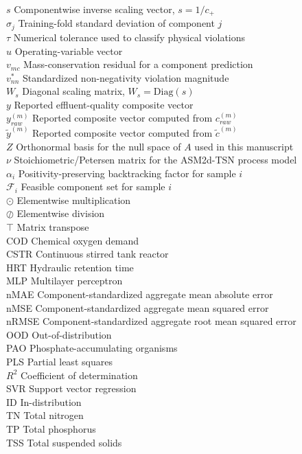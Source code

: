 \documentclass[a4paper,fleqn]{cas-sc}
\begin{document}
\begin{tabbing}
$s$ \> Componentwise inverse scaling vector, $s=1/c_+$ \\
$\sigma_j$ \> Training-fold standard deviation of component $j$ \\
$\tau$ \> Numerical tolerance used to classify physical violations \\
$u$ \> Operating-variable vector \\
$v_{mc}$ \> Mass-conservation residual for a component prediction \\
$v_{nn}^{*}$ \> Standardized non-negativity violation magnitude \\
$W_s$ \> Diagonal scaling matrix, $W_s=\mathrm{Diag}(s)$ \\
$y$ \> Reported effluent-quality composite vector \\
$y_{raw}^{(m)}$ \> Reported composite vector computed from $c_{raw}^{(m)}$ \\
$\tilde{y}^{(m)}$ \> Reported composite vector computed from $\tilde{c}^{(m)}$ \\
$Z$ \> Orthonormal basis for the null space of $A$ used in this manuscript \\
$\nu$ \> Stoichiometric/Petersen matrix for the ASM2d-TSN process model \\
$\alpha_i$ \> Positivity-preserving backtracking factor for sample $i$ \\
$\mathcal{F}_i$ \> Feasible component set for sample $i$ \\
$\odot$ \> Elementwise multiplication \\
$\oslash$ \> Elementwise division \\
$\top$ \> Matrix transpose \\
COD \> Chemical oxygen demand \\
CSTR \> Continuous stirred tank reactor \\
HRT \> Hydraulic retention time \\
MLP \> Multilayer perceptron \\
nMAE \> Component-standardized aggregate mean absolute error \\
nMSE \> Component-standardized aggregate mean squared error \\
nRMSE \> Component-standardized aggregate root mean squared error \\
OOD \> Out-of-distribution \\
PAO \> Phosphate-accumulating organisms \\
PLS \> Partial least squares \\
$R^2$ \> Coefficient of determination \\
SVR \> Support vector regression \\

ID \> In-distribution \\
TN \> Total nitrogen \\
TP \> Total phosphorus \\
TSS \> Total suspended solids \\
\end{tabbing}
\end{document}
